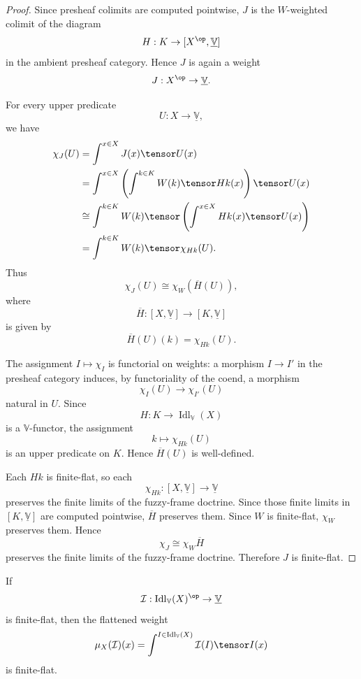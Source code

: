 \begin{proof}
Since presheaf colimits are computed pointwise, \(J\) is the \(W\)-weighted
colimit of the diagram
\[
    H:K\to [X^{\op},\underline{\mathbb V}]
\]
in the ambient presheaf category.  Hence \(J\) is again a weight
\[
    J:X^{\op}\to\underline{\mathbb V}.
\]

For every upper predicate
\[
    U:X\to\underline{\mathbb V},
\]
we have
\[
\begin{aligned}
    \chi_J(U)
    &=
    \int^{x\in X}J(x)\tensor U(x)
    \\
    &=
    \int^{x\in X}
        \left(
            \int^{k\in K}W(k)\tensor Hk(x)
        \right)\tensor U(x)
    \\
    &\cong
    \int^{k\in K}
        W(k)\tensor
        \left(
            \int^{x\in X}Hk(x)\tensor U(x)
        \right)
    \\
    &=
    \int^{k\in K}W(k)\tensor \chi_{Hk}(U).
\end{aligned}
\]
Thus
\[
    \chi_J(U)
    \cong
    \chi_W(\overline H(U)),
\]
where
\[
    \overline H:[X,\underline{\mathbb V}]
    \to
    [K,\underline{\mathbb V}]
\]
is given by
\[
    \overline H(U)(k)=\chi_{Hk}(U).
\]

The assignment \(I\mapsto\chi_I\) is functorial on weights: a morphism
\(I\to I'\) in the presheaf category induces, by functoriality of the coend, a
morphism
\[
    \chi_I(U)\to\chi_{I'}(U)
\]
natural in \(U\).  Since
\[
    H:K\to\operatorname{Idl}_{\mathbb V}(X)
\]
is a \(\mathbb V\)-functor, the assignment
\[
    k\longmapsto \chi_{Hk}(U)
\]
is an upper predicate on \(K\).  Hence \(\overline H(U)\) is well-defined.

Each \(Hk\) is finite-flat, so each
\[
    \chi_{Hk}:[X,\underline{\mathbb V}]\to\underline{\mathbb V}
\]
preserves the finite limits of the fuzzy-frame doctrine.  Since those finite
limits in \([K,\underline{\mathbb V}]\) are computed pointwise, \(\overline H\)
preserves them.  Since \(W\) is finite-flat, \(\chi_W\) preserves them.  Hence
\[
    \chi_J\cong\chi_W\overline H
\]
preserves the finite limits of the fuzzy-frame doctrine.  Therefore \(J\) is
finite-flat.
\end{proof}

\begin{corollary}
\label{cor:flattening-finite-flat-fdom-rewrite}
If
\[
    \mathcal I:
    \operatorname{Idl}_{\mathbb V}(X)^{\op}
    \to
    \underline{\mathbb V}
\]
is finite-flat, then the flattened weight
\[
    \mu_X(\mathcal I)(x)
    =
    \int^{I\in\operatorname{Idl}_{\mathbb V}(X)}
        \mathcal I(I)\tensor I(x)
\]
is finite-flat.
\end{corollary}

